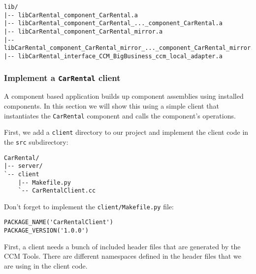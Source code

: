\begin{small}
\begin{verbatim}
lib/
|-- libCarRental_component_CarRental.a
|-- libCarRental_component_CarRental_..._component_CarRental.a
|-- libCarRental_component_CarRental_mirror.a
|-- libCarRental_component_CarRental_mirror_..._component_CarRental_mirror.a
|-- libCarRental_interface_CCM_BigBusiness_ccm_local_adapter.a
\end{verbatim}
\end{small}



\subsubsection{Implement a {\tt CarRental} client}

A component based application builds up component assemblies using installed
components. In this section we will show this using a simple client that
instantiates the {\tt CarRental} component and calls the component's operations.

First, we add a {\tt client} directory to our project and implement
the client code in the {\tt src} subdirectory:
\begin{small}
\begin{verbatim}
CarRental/
|-- server/
`-- client
    |-- Makefile.py
    `-- CarRentalClient.cc
\end{verbatim}
\end{small}

Don't forget to implement the {\tt client/Makefile.py} file:
\begin{small}
\begin{verbatim}
PACKAGE_NAME('CarRentalClient')
PACKAGE_VERSION('1.0.0')
\end{verbatim}
\end{small}

First, a client needs a bunch of included header files that are generated by 
the CCM Tools.
There are different namespaces defined in the header files that we are using 
in the client code.

